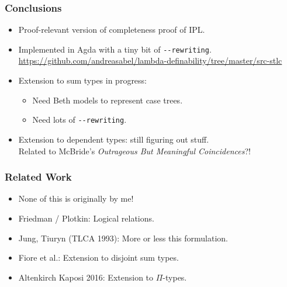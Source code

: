 \documentclass[t,fleqn,usenames,dvipsnames]{beamer}
\newcommand{\cAnn}{\color{red!80!black}}%
\renewcommand{\emph}[1]{{\cAnn#1}}
\newcommand{\cType}{\color{orange!60!black}}
\renewcommand{\emph}[1]{\textit{\cType#1}}
\begin{document}
\begin{frame}[fragile=singleslide]
  \frametitle{Conclusions}
  \vspace{-3ex}
  \begin{itemize}
  \item Proof-relevant version of completeness proof of IPL.
  \item Implemented in Agda with a tiny bit of \verb|--rewriting|.\\
  \url{https://github.com/andreasabel/lambda-definability/tree/master/src-stlc}
  \item Extension to sum types in progress:
    \begin{itemize}
    \item Need Beth models to represent case trees.
    \item Need lots of \verb|--rewriting|.
    \end{itemize}
  \item Extension to dependent types: still figuring out stuff. \\
    Related to McBride's \emph{Outrageous But Meaningful Coincidences}?!
  \end{itemize}
\end{frame}

\begin{frame}%
  \frametitle{Related Work}
  \begin{itemize}
  \item None of this is originally by me!
  \item Friedman / Plotkin: Logical relations.
  \item Jung, Tiuryn (TLCA 1993): More or less this formulation.
  \item Fiore et al.: Extension to disjoint sum types.
  \item Altenkirch Kaposi 2016: Extension to $\Pi$-types.
  \end{itemize}
\end{frame}





% 
\end{document}
